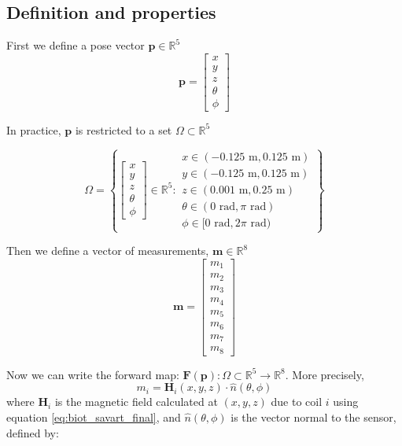\subsection{Definition and properties}
First we define a pose vector $\mathbf{p} \in \mathbb{R}^5$ 
\begin{equation}
  \mathbf{p} = 
  \begin{bmatrix}
    x \\ y \\ z \\ \theta \\ \phi 
  \end{bmatrix}
\end{equation}

In practice, $\mathbf{p}$ is restricted to a set $\Omega \subset \mathbb{R}^5$

\begin{equation}
  \Omega = \left\{
  \begin{bmatrix} x \\ y \\ z \\ \theta \\ \phi \end{bmatrix} \in \mathbb{R}^5 : 
  \begin{matrix} x \in (-0.125\text{ m},0.125\text{ m}) \\ y \in (-0.125\text{ m},0.125\text{ m}) \\ z \in (0.001 \text{ m},0.25\text{ m}) \\ \theta \in (0\text{ rad},\pi\text{ rad}) \\ \phi \in [0\text{ rad},2\pi\text{ rad}) \end{matrix}
  \right\}
\end{equation}

Then we define a vector of measurements, $\mathbf{m} \in \mathbb{R}^8$
\begin{equation}
  \mathbf{m} = 
  \begin{bmatrix}
    m_1 \\ m_2 \\ m_3 \\ m_4 \\ m_5 \\ m_6 \\ m_7 \\ m_8 
  \end{bmatrix}
\end{equation}

Now we can write the forward map: $\mathbf{F}(\mathbf{p}): \Omega \subset \mathbb{R}^5 \rightarrow \mathbb{R}^8$. More precisely,
\begin{equation}
  m_i = \mathbf{H}_i(x,y,z) \cdot \hat{n}(\theta,\phi) 
  \label{eq:forward}
\end{equation}
where $\mathbf{H}_i$ is the magnetic field calculated at $(x,y,z)$ due to coil $i$ using equation \eqref{eq:biot_savart_final}, and $\hat{n}(\theta,\phi)$ is the vector normal to the sensor, defined by: 


